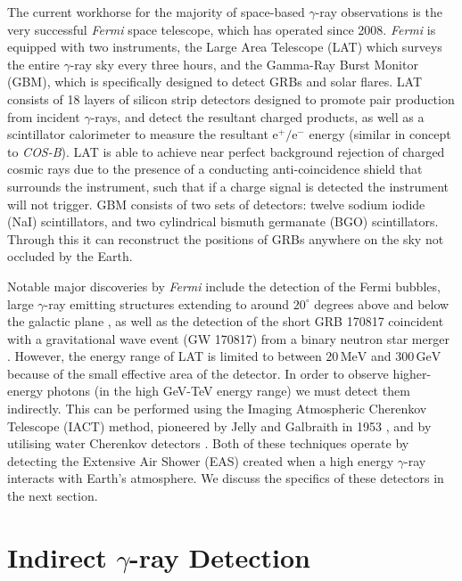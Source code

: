 The current workhorse for the majority of space-based $\gamma$-ray observations is the very successful \textit{Fermi} space telescope, which has operated since 2008. \textit{Fermi} is equipped with two instruments, the Large Area Telescope (LAT) which surveys the entire $\gamma$-ray sky every three hours, and the Gamma-Ray Burst Monitor (GBM), which is specifically designed to detect GRBs and solar flares. LAT consists of 18 layers of silicon strip detectors designed to promote pair production from incident $\gamma$-rays, and detect the resultant charged products, as well as a scintillator calorimeter to measure the resultant $\mathrm{e^+/e^-}$ energy (similar in concept to \textit{COS-B}). LAT is able to achieve near perfect background rejection of charged cosmic rays due to the presence of a conducting anti-coincidence shield that surrounds the instrument, such that if a charge signal is detected the instrument will not trigger. GBM consists of two sets of detectors: twelve sodium iodide (NaI) scintillators, and two cylindrical bismuth germanate (BGO) scintillators. Through this it can reconstruct the positions of GRBs anywhere on the sky not occluded by the Earth. 

Notable major discoveries by \textit{Fermi} include the detection of the Fermi bubbles, large $\gamma$-ray emitting structures extending to around $\mathrm{20^{\circ}}$ degrees above and below the galactic plane \cite{hooperslayter}, as well as the detection of the short GRB 170817 coincident with a gravitational wave event (GW 170817) from a binary neutron star merger \cite{ligogrb}. However, the energy range of LAT is limited to between $\mathrm{20\,MeV}$ and $\mathrm{300\,GeV}$ because of the small effective area of the detector. In order to observe higher-energy photons (in the high GeV-TeV energy range) we must detect them indirectly. This can be performed using the Imaging Atmospheric Cherenkov Telescope (IACT) method, pioneered by Jelly and Galbraith in 1953 \cite{G+J}, and by utilising water Cherenkov detectors  \cite{hawc}. Both of these techniques operate by detecting the Extensive Air Shower (EAS) created when a high energy $\gamma$-ray interacts with Earth's atmosphere. We discuss the specifics of these detectors in the next section. 

\section{Indirect \ensuremath{\gamma}-ray Detection}
